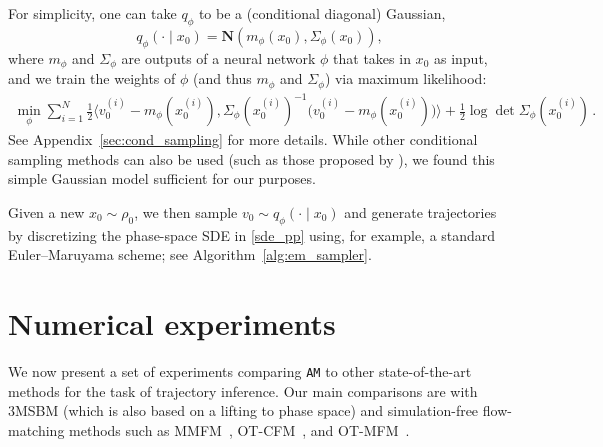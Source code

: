 \documentclass[12pt]{article}
\theoremstyle{plain}
\theoremstyle{plain}
\theoremstyle{remark}
\newcommand{\gauss}{\mathbf{N}}
\newcommand{\1}{\bm{1}}
\theoremstyle{plain}
\theoremstyle{definition}
\theoremstyle{remark}
\begin{document}
For simplicity, one can take $q_\phi$ to be a (conditional diagonal) Gaussian,
\[
    q_\phi(\cdot\mid x_0)
    =
    \gauss(m_\phi(x_0),\Sigma_\phi(x_0)),
\]
where $m_\phi$ and $\Sigma_\phi$ are outputs of a neural network $\phi$ that takes in $x_0$ as input, and we train the weights of $\phi$ (and thus $m_\phi$ and $\Sigma_\phi$) via maximum likelihood:
\begin{align*}
    \min_\phi \sum_{i=1}^N
    \frac{1}{2}
    \langle
    v_0^{(i)} - m_{\phi}(x_0^{(i)}),
    \Sigma_{\phi}(x_0^{(i)})^{-1}
    \bigl(v_0^{(i)} - m_{\phi}(x_0^{(i)})\bigr)
    \rangle
    +
    \frac{1}{2}\log\det \Sigma_{\phi}(x_0^{(i)})\,.
\end{align*}
See Appendix~\ref{sec:cond_sampling} for more details. While other conditional sampling methods can also be used (such as those proposed by \cite{baptista2024conditional}), we found this simple Gaussian model sufficient for our purposes.

Given a new $x_0\sim\rho_0$, we then sample $v_0\sim q_\phi(\cdot\mid x_0)$ and generate trajectories by discretizing the phase-space SDE in \eqref{sde_pp} using, for example, a standard Euler--Maruyama scheme; see Algorithm~\ref{alg:em_sampler}.

\begin{algorithm}[t]
\caption{Euler--Maruyama sampler}
\label{alg:em_sampler}
\end{algorithm}


\section{Numerical experiments}\label{sec:results}
We now present a set of experiments comparing \texttt{AM} to other state-of-the-art methods for the task of trajectory inference. Our main comparisons are with 3MSBM \citep{theodoropoulos2025momentum} (which is also based on a lifting to phase space) and simulation-free flow-matching methods such as MMFM~\citep{rohbeck2025modeling}, OT-CFM~\citep{tong2023improving,pooladian2023multisample}, and OT-MFM~\citep{kapusniak2024metric}.
\end{document}
